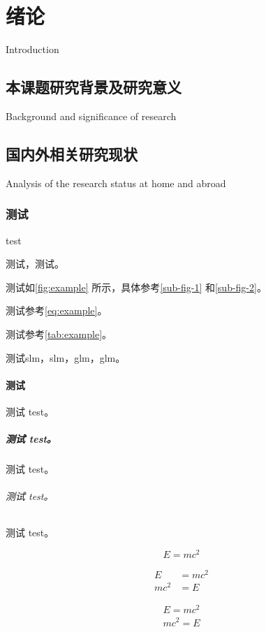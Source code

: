 \chapter{绪论}{Introduction}

\section{本课题研究背景及研究意义}{Background and significance of research}

\zhlipsum[1]

\section{国内外相关研究现状}{Analysis of the research status at home and abroad}

\subsection{测试}{test}

测试，测试。

测试如\autoref{fig:example} 所示，具体参考\autoref{sub-fig-1} 和\autoref{sub-fig-2}。

测试参考\autoref{eq:example}。

测试参考\autoref{tab:example}。

测试\gls{slm}，\gls{slm}，\gls{glm}，\gls{glm}。

\subsubsection{测试}
测试 test。
\paragraph{测试 test。}
测试 test。
\subparagraph{测试 test。}
测试 test。

\begin{equation}\label{eq:example}
  E = mc^2
\end{equation}

\begin{align}
  E &= mc^2 \\
  mc^2 &= E
\end{align}

\begin{gather}
  E = mc^2 \\
  mc^2 = E
\end{gather}


